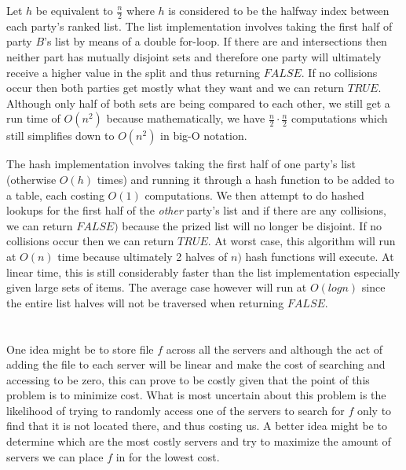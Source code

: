 \documentclass[12pt]{article}
\begin{document}
\noindent Let \(h\) be equivalent to \(\frac{n}{2}\) where \(h\) is considered to be the halfway index between each party's ranked list. The list implementation involves taking the first half of party \(B\)'s list by means of a double for-loop. If there are and intersections then neither part has mutually disjoint sets and therefore one party will ultimately receive a higher value in the split and thus returning \(FALSE\). If no collisions occur then both parties get mostly what they want and we can return \(TRUE\). Although only half of both sets are being compared to each other, we still get a run time of \(O(n^2)\) because mathematically, we have \(\frac{n}{2}\cdot\frac{n}{2}\) computations which still simplifies down to \(O(n^2)\) in big-O notation.\newline

\noindent The hash implementation involves taking the first half of one party's list (otherwise \(O(h)\) times) and running it through a hash function to be added to a table, each costing \(O(1)\) computations. We then attempt to do hashed lookups for the first half of the \textit{other} party's list and if there are any collisions, we can return \(FALSE)\) because the prized list will no longer be disjoint. If no collisions occur then we can return \(TRUE\). At worst case, this algorithm will run at \(O(n)\) time because ultimately 2 halves of \(n)\) hash functions will execute. At linear time, this is still considerably faster than the list implementation especially given large sets of items. The average case however will run at \(O(logn)\) since the entire list halves will not be traversed when returning \(FALSE\). 

\section{}
One idea might be to store file \(f\) across all the servers and although the act of adding the file to each server will be linear and make the cost of searching and accessing to be zero, this can prove to be costly given that the point of this problem is to minimize cost. What is most uncertain about this problem is the likelihood of trying to randomly access one of the servers to search for \(f\) only to find that it is not located there, and thus costing us. A better idea might be to determine which are the most costly servers and try to maximize the amount of servers we can place \(f\) in for the lowest cost.\newline
\end{document}
